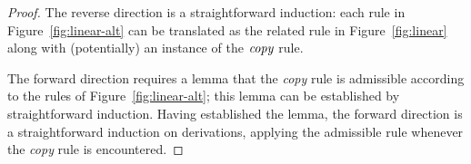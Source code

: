 \begin{proof}
The reverse direction is a straightforward induction: each rule in 
Figure~\ref{fig:linear-alt} can be translated as the related rule
in Figure~\ref{fig:linear} along with (potentially) an instance of 
the ${\it copy}$ rule.

The forward direction requires a lemma that the {\it copy} rule is
admissible according to the rules of Figure~\ref{fig:linear-alt}; this
lemma can be established by straightforward induction. Having
established the lemma, the forward direction is a straightforward
induction on derivations, applying the admissible rule whenever the 
{\it copy} rule is encountered.
\end{proof}




